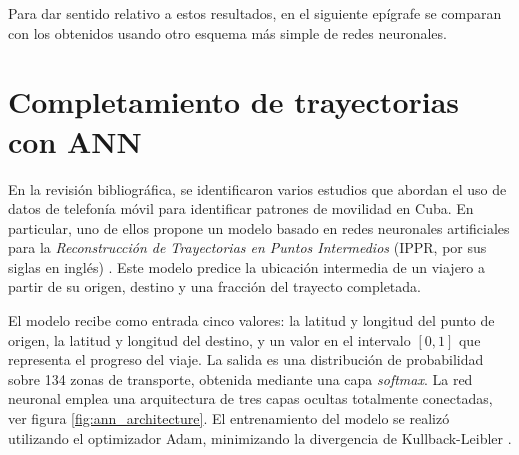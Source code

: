 Para dar sentido relativo a estos resultados, en el siguiente ep\'igrafe se comparan con los obtenidos usando otro esquema m\'as simple de redes neuronales.

\section{Completamiento de trayectorias con ANN}

En la revisión bibliográfica, se identificaron varios estudios \cite{rodriguez2022movilidad, padron2021transporte, garciaborroto2021, durive2021sistema} que abordan el uso de datos de telefonía móvil para identificar patrones de movilidad en Cuba. En particular, uno de ellos propone un modelo basado en redes neuronales artificiales para la \textit{Reconstrucción de Trayectorias en Puntos Intermedios} (IPPR, por sus siglas en inglés) \cite{rodriguez2022movilidad}. Este modelo predice la ubicación intermedia de un viajero a partir de su origen, destino y una fracción del trayecto completada.

El modelo recibe como entrada cinco valores: la latitud y longitud del punto de origen, la latitud y longitud del destino, y un valor en el intervalo $[0,1]$ que representa el progreso del viaje. La salida es una distribución de probabilidad sobre 134 zonas de transporte, obtenida mediante una capa \textit{softmax}. La red neuronal emplea una arquitectura de tres capas ocultas totalmente conectadas, ver figura \ref{fig:ann_architecture}. El entrenamiento del modelo se realizó utilizando el optimizador Adam, minimizando la divergencia de Kullback-Leibler \cite{van2014renyi}.

